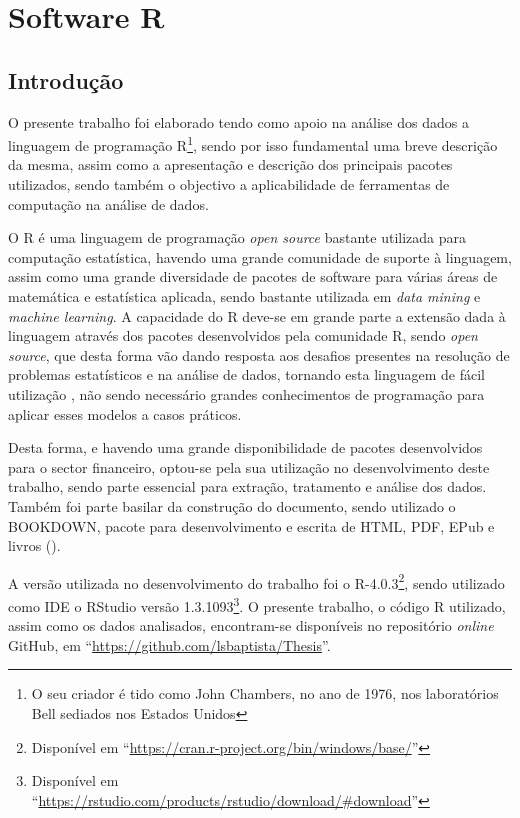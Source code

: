 \documentclass[
  12pt,
  a4paper,
  openany]{book}
\theoremstyle{definition}
\theoremstyle{definition}
\theoremstyle{definition}
\theoremstyle{remark}
\begin{document}
\hypertarget{software-r}{%
\chapter{Software R}\label{software-r}}

\newpage

\hypertarget{introduuxe7uxe3o-1}{%
\section{Introdução}\label{introduuxe7uxe3o-1}}

O presente trabalho foi elaborado tendo como apoio na análise dos dados a linguagem de programação R\footnote{O seu criador é tido como John Chambers, no ano de 1976, nos laboratórios Bell sediados nos Estados Unidos}, sendo por isso fundamental uma breve descrição da mesma, assim como a apresentação e descrição dos principais pacotes utilizados, sendo também o objectivo a aplicabilidade de ferramentas de computação na análise de dados.

O R é uma linguagem de programação \emph{open source} bastante utilizada para computação estatística, havendo uma grande comunidade de suporte à linguagem, assim como uma grande diversidade de pacotes de software para várias áreas de matemática e estatística aplicada, sendo bastante utilizada em \emph{data mining} e \emph{machine learning}. A capacidade do R deve-se em grande parte a extensão dada à linguagem através dos pacotes desenvolvidos pela comunidade R, sendo \emph{open source}, que desta forma vão dando resposta aos desafios presentes na resolução de problemas estatísticos e na análise de dados, tornando esta linguagem de fácil utilização , não sendo necessário grandes conhecimentos de programação para aplicar esses modelos a casos práticos.

Desta forma, e havendo uma grande disponibilidade de pacotes desenvolvidos para o sector financeiro, optou-se pela sua utilização no desenvolvimento deste trabalho, sendo parte essencial para extração, tratamento e análise dos dados. Também foi parte basilar da construção do documento, sendo utilizado o BOOKDOWN, pacote para desenvolvimento e escrita de HTML, PDF, EPub e livros (\citet{R-bookdown}).

A versão utilizada no desenvolvimento do trabalho foi o R-4.0.3\footnote{Disponível em ``\url{https://cran.r-project.org/bin/windows/base/}''}, sendo utilizado como IDE o RStudio versão 1.3.1093\footnote{Disponível em ``\url{https://rstudio.com/products/rstudio/download/\#download}''}. O presente trabalho, o código R utilizado, assim como os dados analisados, encontram-se disponíveis no repositório \emph{online} GitHub, em ``\url{https://github.com/lsbaptista/Thesis}''.
\end{document}
